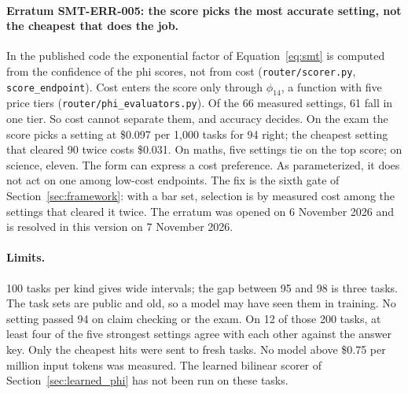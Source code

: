\paragraph{Erratum SMT-ERR-005: the score picks the most accurate setting, not the cheapest that does the job.} In the published code the exponential factor of Equation~\ref{eq:smt} is computed from the confidence of the phi scores, not from cost (\texttt{router/scorer.py}, \texttt{score\_endpoint}). Cost enters the score only through $\phi_{14}$, a function with five price tiers (\texttt{router/phi\_evaluators.py}). Of the 66 measured settings, 61 fall in one tier. So cost cannot separate them, and accuracy decides. On the exam the score picks a setting at \$0.097 per 1{,}000 tasks for 94 right; the cheapest setting that cleared 90 twice costs \$0.031. On maths, five settings tie on the top score; on science, eleven. The form can express a cost preference. As parameterized, it does not act on one among low-cost endpoints. The fix is the sixth gate of Section~\ref{sec:framework}: with a bar set, selection is by measured cost among the settings that cleared it twice. The erratum was opened on 6 November 2026 and is resolved in this version on 7 November 2026.

\paragraph{Limits.} 100 tasks per kind gives wide intervals; the gap between 95 and 98 is three tasks. The task sets are public and old, so a model may have seen them in training. No setting passed 94 on claim checking or the exam. On 12 of those 200 tasks, at least four of the five strongest settings agree with each other against the answer key. Only the cheapest hits were sent to fresh tasks. No model above \$0.75 per million input tokens was measured. The learned bilinear scorer of Section~\ref{sec:learned_phi} has not been run on these tasks.

